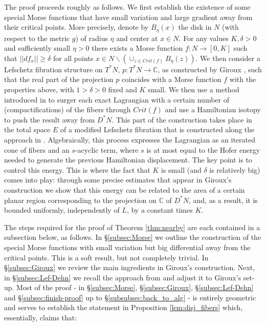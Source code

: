 The  proof proceeds roughly as follows.  We first establish the existence
of some special Morse functions that have small variation and large gradient away from their critical points. More precisely, denote by $B_{\eta}(x)$ the disk in $N$ (with respect to the metric $g$) of radius $\eta$ and center at $x\in N$.  
For any values $K, \delta >0$ and sufficiently small $\eta >0$ there
exists a Morse function $f:N\to [0, K]$ such that $||d f_{x}||\geq \delta$ for all points $x\in N\backslash (\cup_{z\in Crit(f)} B_{\eta}(z))$.  We then consider a Lefschetz 
fibration structure on $T^{\ast}N$, $p:T^{\ast}N\to \mathbb{C}$, 
as constructed by  Giroux \cite{Gir:Lef-cot}, such that the real part of the projection $p$ coincides with a Morse function
 $f$ with the properties above, with $1>\delta>0$ fixed and $K$ small. We then use a method introduced in \cite{Bi-Co:lefcob-pub} to surger each exact Lagrangian with a certain number of (compactifications) of the fibers through $Crit(f)$ and  use a Hamiltonian isotopy to push the result away from $D^{\ast}N$.  This part of the construction takes place in the total space $E$ of a modified Lefschetz fibration that is constructed along the approach in \cite{Bi-Co:lefcob-pub}.  Algebraically,
this process  expresses the Lagrangian as an iterated cone of fibers and an $s$-acyclic term, where $s$ is at most equal to the Hofer energy needed to generate the previous Hamiltonian displacement. The key point is to control this energy. This is where  the fact that $K$ is small (and $\delta$ is relatively big) comes into play:  through some precise estimates that appear in Giroux's construction we show that this energy  can be related to the area of a certain planar region corresponding to the projection on $\mathbb{C}$ of $D^{\ast}N$, and, as a result, it is bounded uniformly, independently of $L$, by a constant times $K$.

The  steps required for the proof of Theorem \ref{thm:nearby} are each contained in a subsection below, as follows.  In \S\ref{subsec:Morse} we outline the construction of the special Morse functions with small variation but big differential away from the critical points. This is a soft result, but not completely trivial. In \S\ref{subsec:Giroux} we review the main ingredients in Giroux's construction. Next, in \S\ref{subsec:Lef-Dehn} we
recall the approach from \cite{Bi-Co:lefcob-pub} and adjust it to Giroux's set-up. Most of the proof -  in \S\ref{subsec:Morse}, \S\ref{subsec:Giroux}, \S\ref{subsec:Lef-Dehn} and \S\ref{subsec:finish-proof} up to \S\ref{subsubsec:back_to_alg} -  is entirely geometric and serves to establish the statement in Proposition \ref{lem:disj_fibers} which, essentially,  claims that:

